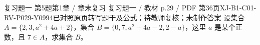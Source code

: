 \par\noindent\begin{minipage}{\linewidth}
\begin{bankitem}{复习题一 第5题}{第1章 / 章末复习 复习题一 / 教材 p.29 / PDF 第36页}{XJ-B1-C01-RV-P029-Y0994}{已对照原页转写题干及公式；待教师复核；未制作答案}
设集合 $A=\{2,3,a^2+4a+2\}$，集合 $B=\{0,7,a^2+4a-2,2-a\}$，这里 $a$ 是某个正数，且 $7\in A$，求集合 $B$。
\end{bankitem}
\end{minipage}\par\medskip
